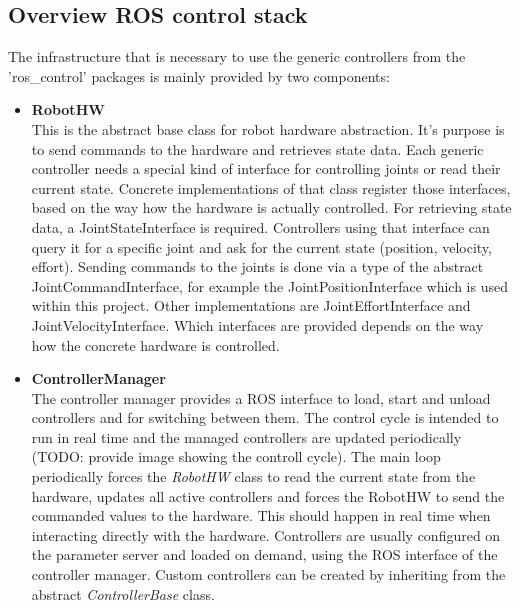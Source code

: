 \subsection{Overview ROS control stack}

The infrastructure that is necessary to use the generic controllers from the 'ros\_control' packages is mainly provided by two components:

\begin{itemize}

\item \textbf{RobotHW} \\

This is the abstract base class for robot hardware abstraction. It's purpose is to send commands to the hardware and retrieves state data. Each generic controller needs a special kind of interface for controlling joints or read their current state. Concrete implementations of that class register those interfaces, based on the way how the hardware is actually controlled. For retrieving state data, a JointStateInterface is required. Controllers using that interface can query it for a specific joint and ask for the current state (position, velocity, effort). Sending commands to the joints is done via a type of the abstract JointCommandInterface, for example the JointPositionInterface which is used within this project. Other implementations are JointEffortInterface and JointVelocityInterface. Which interfaces are provided depends on the way how the concrete hardware is controlled.

\item \textbf{ControllerManager} \\

The controller manager provides a ROS interface to load, start and unload controllers and for switching between them. The control cycle is intended to run in real time
and the managed controllers are updated periodically (TODO: provide image showing the controll cycle). The main loop periodically forces the \emph{RobotHW} class to read the current state from the hardware, updates all active controllers and forces the RobotHW to send the commanded values to the hardware. This should happen in real time when interacting directly with the hardware. Controllers are usually configured on the parameter server and loaded on demand, using the ROS interface of the controller manager. Custom controllers can be created by inheriting from the abstract  \emph{ControllerBase} class.  

\end{itemize}

